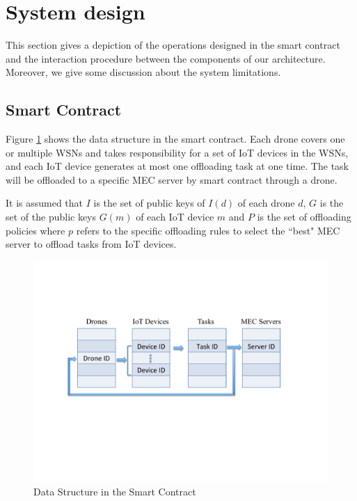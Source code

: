 \section{System design}\label{sec:sys}
This section gives a depiction of the operations designed in the smart contract and the interaction procedure between the components of our architecture. Moreover, we give some discussion about the system limitations. 
 
\subsection{Smart Contract}
Figure \ref{fig:data-structure} shows the data structure in the smart contract.
Each drone covers one or multiple WSNs and takes responsibility for a set of IoT devices in the WSNs, and each IoT device generates at most one offloading task at one time.
The task will be offloaded to a specific MEC server by smart contract through a drone.

It is assumed that $I$ is the set of public keys of $I(d)$ of each drone $d$, 
$G$ is the set of the public keys $G(m)$ of each IoT device $m$ and $P$ is the set of offloading policies where $p$ refers to the specific offloading rules to select the ``best" MEC server to offload tasks from IoT devices.


\begin{figure}[t]
\centering
\includegraphics[width=3.3 in]{Fig/DataStructure.pdf}
\caption{Data Structure in the Smart Contract}
\label{fig:data-structure}
\end{figure}

